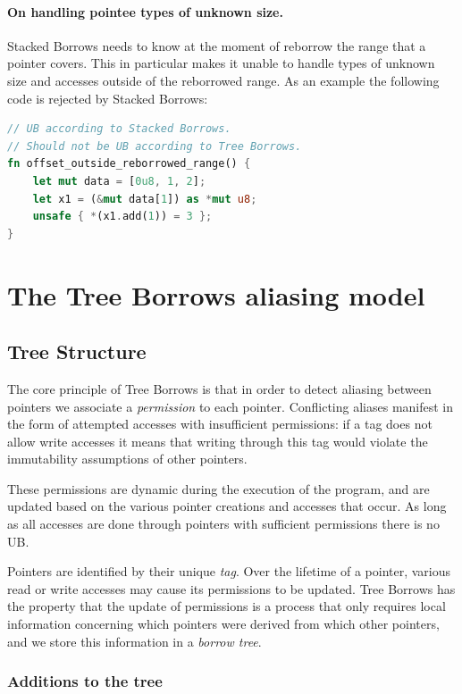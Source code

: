 \documentclass[a4paper,11pt]{article}
\theoremstyle{plain}
\theoremstyle{definition}
\theoremstyle{remark}
\begin{document}
\paragraph*{On handling pointee types of unknown size.}
Stacked Borrows needs to know at the moment of reborrow the range that a pointer
covers. This in particular makes it unable to handle types of unknown size and
accesses outside of the reborrowed range.
As an example the following code is rejected by Stacked Borrows:
\begin{lstlisting}[language=rust]
// UB according to Stacked Borrows.
// Should not be UB according to Tree Borrows.
fn offset_outside_reborrowed_range() {
    let mut data = [0u8, 1, 2];
    let x1 = (&mut data[1]) as *mut u8;
    unsafe { *(x1.add(1)) = 3 };
}
\end{lstlisting}

\section{The Tree Borrows aliasing model}

\subsection{Tree Structure}
\label{sec:tree-structure}

The core principle of Tree Borrows is that in order to detect aliasing between
pointers we associate a \textit{permission} to each pointer. Conflicting aliases
manifest in the form of attempted accesses with insufficient permissions: if
a tag does not allow write accesses it means that writing through this tag
would violate the immutability assumptions of other pointers.

These permissions are dynamic during the execution of the program, and are
updated based on the various pointer creations and accesses that occur. As
long as all accesses are done through pointers with sufficient permissions there
is no UB.

Pointers are identified by their unique \textit{tag}. Over the lifetime of a pointer,
various read or write accesses may cause its permissions to be updated.
Tree Borrows has the property that the update of permissions is a process
that only requires local information concerning which pointers were derived from
which other pointers, and we store this information in a \textit{borrow tree}.

\subsubsection{Additions to the tree}
\end{document}
